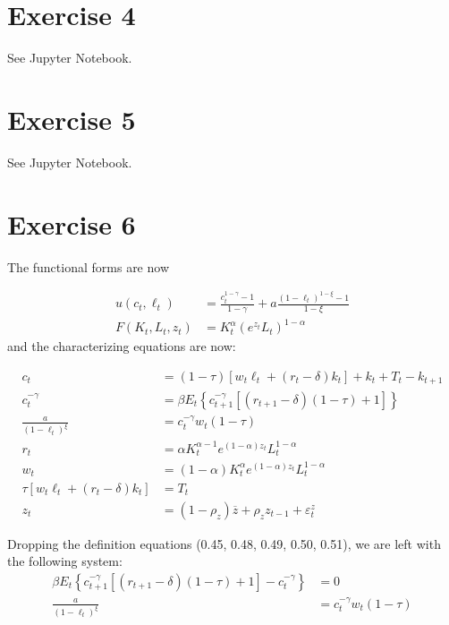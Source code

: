 \documentclass[11pt]{article}
\numberwithin{equation}{section}
\theoremstyle{plain}
\theoremstyle{definition}
\newcommand\parens[1]{\left( #1 \right)}
\newcommand{\1}{\mathbbm 1}
\def\a{\alpha}
\def\g{\gamma}
\newcommand{\e}{\varepsilon}
\begin{document}
\section*{Exercise 4}

See Jupyter Notebook.

\section*{Exercise 5}

See Jupyter Notebook.

\section*{Exercise 6}

The functional forms are now 

\begin{align} 
 u\left(c_{t}, \ell_{t}\right) &=\frac{c_{t}^{1-\gamma}-1}{1-\gamma}+a \frac{\left(1-\ell_{t}\right)^{1-\xi}-1}{1-\xi} \\ 
  F\left(K_{t}, L_{t}, z_{t}\right) &= K_{t}^{\alpha} \parens{e^{z_{t}} L_{t}}^{1-\alpha} 
 \end{align}
and the characterizing equations are now:

\begin{align}
c_{t}&=(1-\tau)\left[w_{t} \ell_{t}+\left(r_{t}-\delta\right) k_{t}\right]+k_{t}+T_{t}-k_{t+1} \\
c_t^{-\g}&=\beta E_{t}\left\{c_{t+1}^{-\g}\left[\left(r_{t+1}-\delta\right)(1-\tau)+1\right]\right\} \\
\frac{a}{(1-\ell_t)^{\xi}}&=c_t^{-\g} w_{t}(1-\tau) \\
r_{t}&=\a K_{t}^{\alpha - 1} e^{(1-\alpha)z_{t}}L_t^{1-\a}\\
w_{t}&=(1-\a)K_{t}^{\alpha} e^{(1- \alpha) z_{t}}L_t^{1-\a} \\
\tau\left[w_{t} \ell_{t}+\left(r_{t}-\delta\right) k_{t}\right]&=T_t\\
z_t&= (1 - \rho_z) \overline{z} + \rho_z z_{t-1} + \e_t^{z}
\end{align}

Dropping the definition equations (0.45, 0.48, 0.49, 0.50, 0.51), we are left with the following system:
\begin{align}
\beta E_{t}\left\{c_{t+1}^{-\g}\left[\left(r_{t+1}-\delta\right)(1-\tau)+1\right] - c_t^{-\g}\right\} &= 0 \\
\frac{a}{(1-\ell_t)^{\xi}}&=c_t^{-\g} w_{t}(1-\tau) \\
\end{align}
\end{document}
